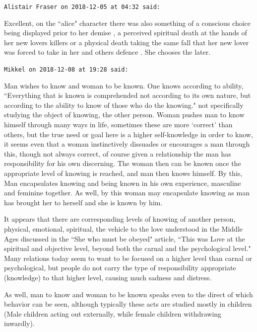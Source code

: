 \begin{footnotesize}\begin{sffamily}



\texttt{Alistair Fraser on 2018-12-05 at 04:32 said: }

Excellent, on the ``alice" character there was also something of a conscious choice being displayed prior to her demise , a perceived spiritual death at the hands of her new lovers killers or a physical death taking the same fall that her new lover was forced to take in her and others defence . She chooses the later.


\hfill

\texttt{Mikkel on 2018-12-08 at 19:28 said: }

Man wishes to know and woman to be known. One knows according to ability, ``Everything that is known is comprehended not according to its own nature, but according to the ability to know of those who do the knowing." not specifically studying the object of knowing, the other person. Woman pushes man to know himself through many ways in life, sometimes these are more `correct' than others, but the true need or goal here is a higher self-knowledge in order to know, it seems even that a woman instinctively dissuades or encourages a man through this, though not always correct, of course given a relationship the man has responsibility for his own discerning. The woman then can be known once the appropriate level of knowing is reached, and man then knows himself. By this, Man encapsulates knowing and being known in his own experience, masculine and feminine together. As well, by this woman may encapsulate knowing as man has brought her to herself and she is known by him.

It appears that there are corresponding levels of knowing of another person, physical, emotional, spiritual, the vehicle to the love understood in the Middle Ages discussed in the ``She who must be obeyed" article, ``This was Love at the spiritual and objective level, beyond both the carnal and the psychological level." Many relations today seem to want to be focused on a higher level than carnal or psychological, but people do not carry the type of responsibility appropriate (knowledge) to that higher level, causing much sadness and distress.

As well, man to know and woman to be known speaks even to the direct of which behavior can be seen, although typically these acts are studied mostly in children (Male children acting out externally, while female children withdrawing inwardly).


\end{sffamily}\end{footnotesize}
